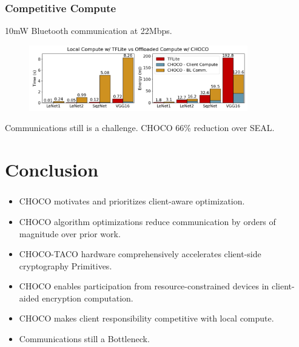 \documentclass[10pt,handout]{beamer}
\begin{document}
\begin{frame}
    \frametitle{Competitive Compute}
    10mW Bluetooth communication at 22Mbps.

    \begin{figure}
        \includegraphics[width=0.85\textwidth]{energy.png}
    \end{figure}

    Communications still is a challenge. CHOCO 66\% reduction over SEAL.


\end{frame}

%
%
%

\section{Conclusion}
\begin{frame}
\frametitle{}
\begin{itemize}
    \item CHOCO motivates and prioritizes client-aware optimization.
    \item CHOCO algorithm optimizations reduce communication by orders of magnitude over prior work.
    \item CHOCO-TACO hardware comprehensively accelerates client-side cryptography Primitives.
    \item CHOCO enables participation from resource-constrained devices in client-aided encryption computation.
    \item CHOCO makes client responsibility competitive with local compute.
    \item Communications still a Bottleneck.
\end{itemize}

\end{frame}
\end{document}
